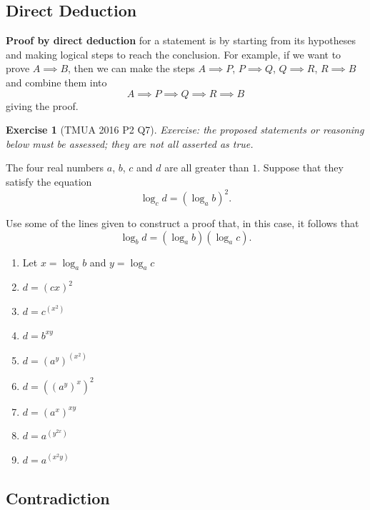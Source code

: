 \documentclass[11pt]{article}
\theoremstyle{definition}
\newtheorem{example}[theorem]{Exercise}
\theoremstyle{remark}
\newcommand{\pqty}[1]{\left(#1\right)}
\begin{document}
\subsection{Direct Deduction}\label{tmua-6-subsection-007}

\textbf{Proof by direct deduction} for a statement is by starting from its hypotheses and making logical steps to reach the conclusion. For example, if we want to prove \(A \implies B\), then we can make the steps \(A \implies P\), \(P \implies Q\), \(Q \implies R\), \(R \implies B\) and combine them into
\[
    A \implies P \implies Q \implies R \implies B
\]
giving the proof.

\begin{example}[TMUA 2016 P2 Q7]\label{tmua-6-unit-019}
\textit{Exercise: the proposed statements or reasoning below must be assessed; they are not all asserted as true.}\par

    The four real numbers \(a\), \(b\), \(c\) and \(d\) are all greater than \(1\). Suppose that they satisfy the equation
    \[
        \log_c d = \pqty{\log_a b}^2.
    \]

    Use some of the lines given to construct a proof that, in this case, it follows that
    \[
        \log_b d = \pqty{\log_a b} \pqty{\log_a c}.
    \]

    \begin{enumerate}
        \item Let \(x = \log_a b\) and \(y = \log_a c\) \vspace{1em}
        \item \(d = \pqty{c x}^2\)
        \item \(d = c^{\pqty{x^2}}\)
        \item \(d = b^{xy}\) \vspace{1em}
        \item \(d = \pqty{a^y}^{\pqty{x^2}}\)
        \item \(d = \pqty{\pqty{a^y}^x}^2\)
        \item \(d = \pqty{a^x}^{xy}\) \vspace{1em}
        \item \(d = a^{\pqty{y^{2x}}}\)
        \item \(d = a^{\pqty{x^2 y}}\)
    \end{enumerate}
\end{example}

\subsection{Contradiction}\label{tmua-6-subsection-008}
\end{document}
